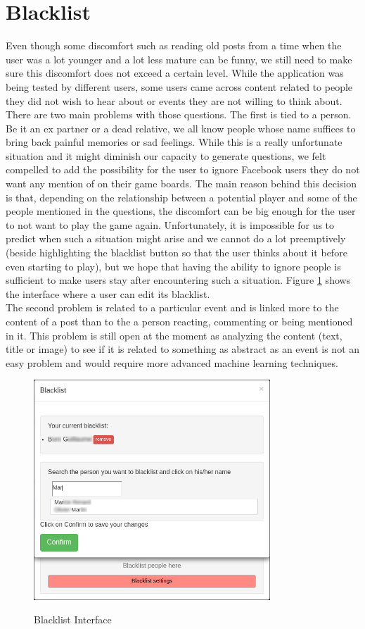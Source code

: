 \section{Blacklist}
Even though some discomfort such as reading old posts from a time when the user was a lot younger and a lot less mature can be funny, we still need to make sure this discomfort does not exceed a certain level. While the application was being tested by different users, some users came across content related to people they did not wish to hear about or events they are not willing to think about.\\
There are two main problems with those questions. The first is tied to a person. Be it an ex partner or a dead relative, we all know people whose name suffices to bring back painful memories or sad feelings. While this is a really unfortunate situation and it might diminish our capacity to generate questions, we felt compelled to add the possibility for the user to ignore Facebook users they do not want any mention of on their game boards. The main reason behind this decision is that, depending on the relationship between a potential player and some of the people mentioned in the questions, the discomfort can be big enough for the user to not want to play the game again. Unfortunately, it is impossible for us to predict when such a situation might arise and we cannot do a lot preemptively (beside highlighting the blacklist button so that the user thinks about it before even starting to play), but we hope that having the ability to ignore people is sufficient to make users stay after encountering such a situation. Figure \ref{fig:blacklist} shows the interface where a user can edit its blacklist.\\
The second problem is related to a particular event and is linked more to the content of a post than to the a person reacting, commenting or being mentioned in it. This problem is still open at the moment as analyzing the content (text, title or image) to see if it is related to something as abstract as an event is not an easy problem and would require more advanced machine learning techniques.
\begin{figure}
\centering
{\includegraphics[width=3.5in]{images/blacklist.png}}
\caption{Blacklist Interface}
\label{fig:blacklist}
\end{figure}

